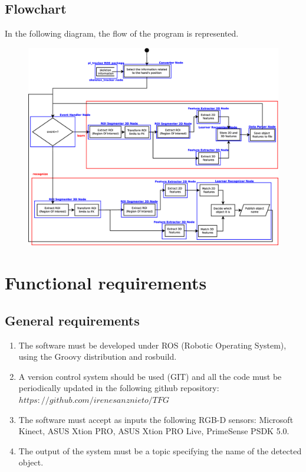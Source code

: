 \documentclass{article}
\makeatletter
\def\threedigits#1{\expandafter\@threedigits\csname c@#1\endcsname}
\def\@threedigits#1{%
  \ifnum#1<100 0\fi
  \ifnum#1<10 0\fi
  \number#1}
\makeatother
\begin{document}
\begin{center}
\subsection{Flowchart}
In the following diagram, the flow of the program is represented. 
\begin{figure}[H]
\begin{center}
\includegraphics[scale=0.25]{../../img/diagrams/flowcharts.eps}
\end{center}
\end{figure}





\section{Functional requirements}

\subsection{General requirements}

\begin{enumerate}[label=\textbf{FR\threedigits*}, leftmargin=2cm]

	\item The software must be developed under ROS (Robotic Operating System), using the Groovy distribution and rosbuild.
	\item A version control system should be used (GIT) and all the code must be periodically updated in the following github repository:  $https://github.com/irenesanznieto/TFG$
	\item The software must accept as inputs the following RGB-D sensors: Microsoft Kinect, ASUS Xtion PRO, ASUS Xtion PRO Live, PrimeSense PSDK 5.0.
	\item The output of the system must be a topic specifying the name of the detected object. 
 

\end{enumerate}
\end{center}
\end{document}
